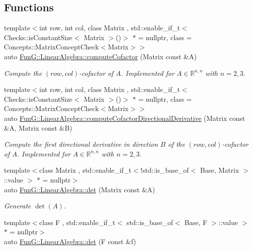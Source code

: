 \subsection*{Functions}
\begin{DoxyCompactItemize}
\item 
{\footnotesize template$<$int row, int col, class Matrix , std\+::enable\+\_\+if\+\_\+t$<$ Checks\+::is\+Constant\+Size$<$ Matrix $>$()$>$ $\ast$  = nullptr, class  = Concepts\+::\+Matrix\+Concept\+Check$<$\+Matrix$>$$>$ }\\auto \hyperlink{group__LinearAlgebraGroup_gace32a0876d4a8333f3bfc564316085ed}{Fun\+G\+::\+Linear\+Algebra\+::compute\+Cofactor} (Matrix const \&A)
\begin{DoxyCompactList}\small\item\em Compute the $(row,col)$-\/cofactor of $ A $. Implemented for $ A\in \mathbb{R}^{n,n} $ with $ n=2,3 $. \end{DoxyCompactList}\item 
{\footnotesize template$<$int row, int col, class Matrix , std\+::enable\+\_\+if\+\_\+t$<$ Checks\+::is\+Constant\+Size$<$ Matrix $>$()$>$ $\ast$  = nullptr, class  = Concepts\+::\+Matrix\+Concept\+Check$<$\+Matrix$>$$>$ }\\auto \hyperlink{group__LinearAlgebraGroup_ga3970ee7fa4d47612427a59cecf56746c}{Fun\+G\+::\+Linear\+Algebra\+::compute\+Cofactor\+Directional\+Derivative} (Matrix const \&A, Matrix const \&B)
\begin{DoxyCompactList}\small\item\em Compute the first directional derivative in direction $ B $ of the $(row,col)$-\/cofactor of $ A $. Implemented for $ A\in \mathbb{R}^{n,n} $ with $ n=2,3 $. \end{DoxyCompactList}\item 
{\footnotesize template$<$class Matrix , std\+::enable\+\_\+if\+\_\+t$<$!std\+::is\+\_\+base\+\_\+of$<$ Base, Matrix $>$\+::value $>$ $\ast$  = nullptr$>$ }\\auto \hyperlink{group__LinearAlgebraGroup_gadb3017b4b2828e25a0784b10396a836f}{Fun\+G\+::\+Linear\+Algebra\+::det} (Matrix const \&A)
\begin{DoxyCompactList}\small\item\em Generate $\det(A)$. \end{DoxyCompactList}\item 
{\footnotesize template$<$class F , std\+::enable\+\_\+if\+\_\+t$<$ std\+::is\+\_\+base\+\_\+of$<$ Base, F $>$\+::value $>$ $\ast$  = nullptr$>$ }\\auto \hyperlink{group__LinearAlgebraGroup_ga552048de67f3412ae0a220b3123db6e5}{Fun\+G\+::\+Linear\+Algebra\+::det} (F const \&f)

\end{DoxyCompactItemize}
